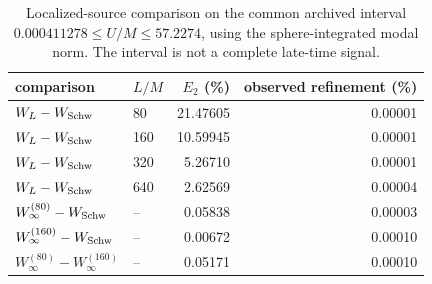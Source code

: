 \begin{table}
\centering
\small
\caption{Localized-source comparison on the common archived interval $0.000411278\leq U/M\leq 57.2274$, using the sphere-integrated modal norm. The interval is not a complete late-time signal.}
\label{tab:localized-source-regulator}
\begin{tabular}{llrr}
\toprule
comparison & $L/M$ & $E_2$ (\%) & observed refinement (\%) \\
\midrule
$W_L-W_{\rm Schw}$ & 80 & 21.47605 & 0.00001 \\
$W_L-W_{\rm Schw}$ & 160 & 10.59945 & 0.00001 \\
$W_L-W_{\rm Schw}$ & 320 & 5.26710 & 0.00001 \\
$W_L-W_{\rm Schw}$ & 640 & 2.62569 & 0.00004 \\
$W_\infty^{(80)}-W_{\rm Schw}$ & -- & 0.05838 & 0.00003 \\
$W_\infty^{(160)}-W_{\rm Schw}$ & -- & 0.00672 & 0.00010 \\
$W_\infty^{(80)}-W_\infty^{(160)}$ & -- & 0.05171 & 0.00010 \\
\bottomrule
\end{tabular}
\end{table}
